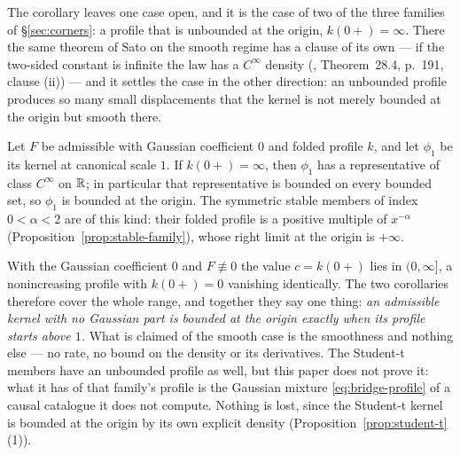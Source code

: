 The corollary leaves one case open, and it is the case of two of the three families of
\S\ref{sec:corners}: a profile that is unbounded at the origin, $k(0{+}) = \infty$. There the
same theorem of Sato on the smooth regime has a clause of its own --- if the two-sided constant is
infinite the law has a $C^\infty$ density (, Theorem~28.4, p.~191, clause
(ii)) --- and it settles the case in the other direction: an unbounded profile produces so many
small displacements that the kernel is not merely bounded at the origin but smooth there.

\begin{corollary}\label{cor:origin-smooth}
Let $F$ be admissible with Gaussian coefficient $0$ and folded profile $k$, and let $\phi_1$ be
its kernel at canonical scale $1$. If $k(0{+}) = \infty$, then $\phi_1$ has a representative of
class $C^\infty$ on $\mathbb{R}$; in particular that representative is bounded on every bounded set, so
$\phi_1$ is bounded at the origin. The symmetric stable members of index $0 < \alpha < 2$ are of
this kind: their folded profile is a positive multiple of $x^{-\alpha}$
(Proposition~\ref{prop:stable-family}), whose right limit at the origin is $+\infty$.
\end{corollary}

With the Gaussian coefficient $0$ and $F \not\equiv 0$ the value $c = k(0{+})$ lies in
$(0,\infty]$, a nonincreasing profile with $k(0{+}) = 0$ vanishing identically. The two
corollaries therefore cover the whole range, and together they say one thing: \emph{an admissible
kernel with no Gaussian part is bounded at the origin exactly when its profile starts above $1$.}
What is claimed of the smooth case is the smoothness and nothing else --- no rate, no bound on
the density or its derivatives. The Student-t members have an unbounded profile as well, but this
paper does not prove it: what it has of that family's profile is the Gaussian mixture
\ref{eq:bridge-profile} of a causal catalogue it does not compute. Nothing is lost, since the
Student-t kernel is bounded at the origin by its own explicit density
(Proposition~\ref{prop:student-t}(1)).

